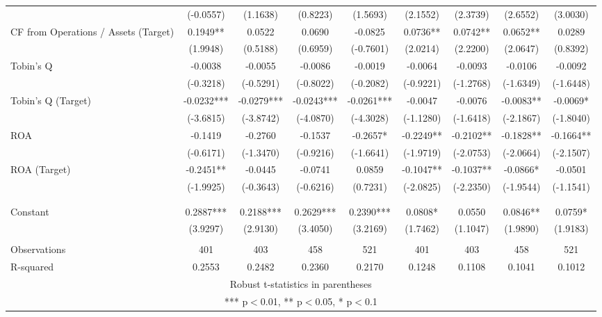 \documentclass[12pt]{article}
\begin{document}
\begin{table}
\begin{adjustbox}{max width=\textwidth}
\begin{tabular}{lcccccccc}
			 & (-0.0557) & (1.1638) & (0.8223) & (1.5693) & (2.1552) & (2.3739) & (2.6552) & (3.0030) \\
			CF from Operations / Assets (Target) & 0.1949** & 0.0522 & 0.0690 & -0.0825 & 0.0736** & 0.0742** & 0.0652** & 0.0289 \\
			 & (1.9948) & (0.5188) & (0.6959) & (-0.7601) & (2.0214) & (2.2200) & (2.0647) & (0.8392) \\
			Tobin's Q & -0.0038 & -0.0055 & -0.0086 & -0.0019 & -0.0064 & -0.0093 & -0.0106 & -0.0092 \\
			 & (-0.3218) & (-0.5291) & (-0.8022) & (-0.2082) & (-0.9221) & (-1.2768) & (-1.6349) & (-1.6448) \\
			Tobin's Q (Target) & -0.0232*** & -0.0279*** & -0.0243*** & -0.0261*** & -0.0047 & -0.0076 & -0.0083** & -0.0069* \\
			 & (-3.6815) & (-3.8742) & (-4.0870) & (-4.3028) & (-1.1280) & (-1.6418) & (-2.1867) & (-1.8040) \\
			ROA & -0.1419 & -0.2760 & -0.1537 & -0.2657* & -0.2249** & -0.2102** & -0.1828** & -0.1664** \\
			 & (-0.6171) & (-1.3470) & (-0.9216) & (-1.6641) & (-1.9719) & (-2.0753) & (-2.0664) & (-2.1507) \\
			ROA (Target) & -0.2451** & -0.0445 & -0.0741 & 0.0859 & -0.1047** & -0.1037** & -0.0866* & -0.0501 \\
			 & (-1.9925) & (-0.3643) & (-0.6216) & (0.7231) & (-2.0825) & (-2.2350) & (-1.9544) & (-1.1541) \\
			 \\
			 &  &  &  &  &  &  &  &  \\
			Constant & 0.2887*** & 0.2188*** & 0.2629*** & 0.2390*** & 0.0808* & 0.0550 & 0.0846** & 0.0759* \\
			 & (3.9297) & (2.9130) & (3.4050) & (3.2169) & (1.7462) & (1.1047) & (1.9890) & (1.9183) \\
			 &  &  &  &  &  &  &  &  \\
			Observations & 401 & 403 & 458 & 521 & 401 & 403 & 458 & 521 \\
			 R-squared & 0.2553 & 0.2482 & 0.2360 & 0.2170 & 0.1248 & 0.1108 & 0.1041 & 0.1012 \\ \hline
			\multicolumn{9}{c}{ Robust t-statistics in parentheses} \\
			\multicolumn{9}{c}{ *** p$<$0.01, ** p$<$0.05, * p$<$0.1} \\
			\end{tabular}			
	\end{adjustbox}
\end{table}
\pagebreak
\end{document}
